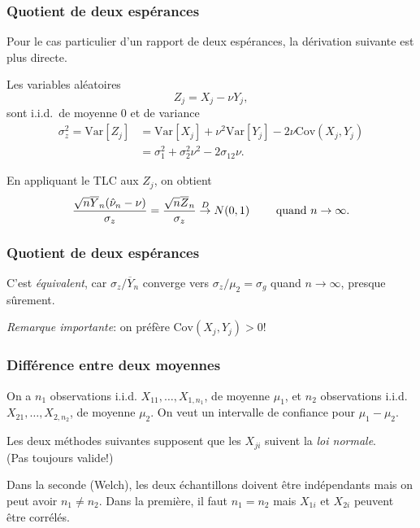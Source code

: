 \documentclass[t,usepdftitle=false]{beamer}
\def\Var{\mbox{Var}}
\def\Cov{\mbox{Cov}}
\def\iid{i.i.d.}
\def\To{\overset{D}{\to}}
\begin{document}
\begin{frame}
\frametitle{Quotient de deux espérances}

Pour le cas particulier d'un rapport de deux espérances, 
la dérivation suivante est plus directe.

\mbox{}

Les variables aléatoires
$$
  {Z_j} = X_j - \nu Y_j,
$$
sont \iid\ de moyenne 0 et de variance
\begin{align*}
  {\sigma_z^2} = \Var[Z_j] & =
   \Var[X_j] + \nu^2\Var[Y_j] - 2\nu \Cov(X_j, Y_j)\\
& = \sigma_1^2 + \sigma_2^2 \nu^2 - 2\sigma_{12}\nu.
\end{align*}

\mbox{}

En appliquant le TLC aux $Z_j$, on obtient
\[
 {\sqrt{n}\overline{Y}_n (\hat\nu_n - \nu) \over \sigma_z}
 = {\sqrt{n} \overline{Z}_n \over \sigma_z}
   \To N(0,1) \qquad\mbox { quand } n\to\infty.
\]

\end{frame}

\begin{frame}
\frametitle{Quotient de deux espérances}

C'est \emph{équivalent}, car $\sigma_z / \overline{Y}_n$ converge vers $\sigma_z / \mu_2 = \sigma_g$ quand $n\to\infty$, presque sûrement.

\mbox{}

\emph{Remarque importante}: on préfère $\Cov(X_j, Y_j) > 0$!

\end{frame}

\begin{frame}
\frametitle{Différence entre deux moyennes}

On a ${n_1}$ observations \iid{} $X_{11},\dots, X_{1,n_1}$,
de moyenne ${\mu_1}$,
et ${n_2}$ observations \iid{} $X_{21},\dots, X_{2,n_2}$, 
de moyenne ${\mu_2}$.
On veut un intervalle de confiance pour ${\mu_1 - \mu_2}$.

\mbox{}

Les deux méthodes suivantes supposent que les $X_{ji}$
suivent la \emph{loi normale}. \\ (Pas toujours valide!)

\mbox{}

Dans la seconde (Welch), les deux échantillons doivent être 
indépendants mais on peut avoir $n_1\not= n_2$.
Dans la première, il faut $n_1 = n_2$ mais $X_{1i}$ et $X_{2i}$
peuvent être corrélés.

\end{frame}
\end{document}
